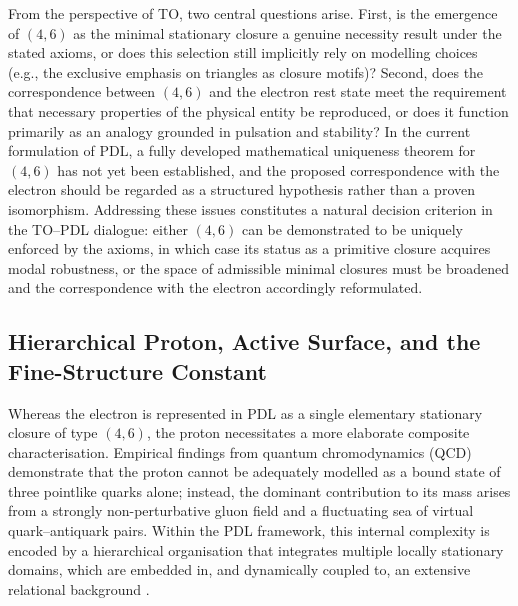 \documentclass[11pt,a4paper]{article}
\begin{document}
From the perspective of TO, two central questions arise. First, is the emergence of \((4,6)\) as the minimal stationary closure a genuine necessity result under the stated axioms, or does this selection still implicitly rely on modelling choices (e.g., the exclusive emphasis on triangles as closure motifs)? Second, does the correspondence between \((4,6)\) and the electron rest state meet the requirement that necessary properties of the physical entity be reproduced, or does it function primarily as an analogy grounded in pulsation and stability? In the current formulation of PDL, a fully developed mathematical uniqueness theorem for \((4,6)\) has not yet been established, and the proposed correspondence with the electron should be regarded as a structured hypothesis rather than a proven isomorphism. Addressing these issues constitutes a natural decision criterion in the TO–PDL dialogue: either \((4,6)\) can be demonstrated to be uniquely enforced by the axioms, in which case its status as a primitive closure acquires modal robustness, or the space of admissible minimal closures must be broadened and the correspondence with the electron accordingly reformulated.

\subsection{Hierarchical Proton, Active Surface, and the Fine-Structure Constant}

Whereas the electron is represented in PDL as a single elementary stationary closure of type $(4,6)$, the proton necessitates a more elaborate composite characterisation. Empirical findings from quantum chromodynamics (QCD) demonstrate that the proton cannot be adequately modelled as a bound state of three pointlike quarks alone; instead, the dominant contribution to its mass arises from a strongly non-perturbative gluon field and a fluctuating sea of virtual quark–antiquark pairs. Within the PDL framework, this internal complexity is encoded by a hierarchical organisation that integrates multiple locally stationary domains, which are embedded in, and dynamically coupled to, an extensive relational background \cite{Laubscher_PDL_IMRad,Laubscher_LDP_fr}.  
\end{document}
